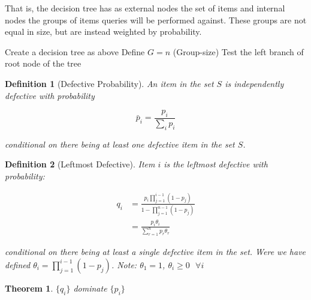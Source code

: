 \documentclass[11pt]{article}
\newtheorem{thm}{Theorem}[section]
\newtheorem{definition}{Definition}[section]
\begin{document}
That is, the decision tree has as external nodes the set of items and internal nodes the groups of items queries will be performed against. These groups are not equal in size, but are instead weighted by probability. 

\bigskip	
\begin{algorithm}[H]
 \SetLine %
 Create a decision tree as above\;
 Define \(G = n\) (Group-size)\;
 {Test the left branch of root node of the tree\;
  }
 \caption{Searching the Tree for a single defective}
\end{algorithm}
\bigskip	

\begin{definition}[Defective Probability]
An item in the set \(S\) is independently defective with probability

\begin{equation}
\bar{p}_i = \frac{p_i}{\sum_i p_i}
\end{equation}

conditional on there being at least one defective item in the set \(S\).
\end{definition}

\begin{definition}[Leftmost Defective]
Item \(i\) is the leftmost defective with probability:

\begin{align}
q_i &= \frac{p_i \prod_{j=1}^{i-1}\left(1-p_j\right)}{1 - \prod_{j=1}^{n-1}\left(1-p_j\right)} \\
&= \frac{p_i\theta_i}{\sum_{r=1}^n p_r\theta_r}
\end{align}

conditional on there being at least a single defective item in the set. Were we have defined \(\theta_i = \prod_{j=1}^{i-1}\left(1-p_j\right)\). Note: \(\theta_1 = 1\),  \( \theta_i \geq 0 \text{ } \forall i\)
\end{definition}

\begin{thm}
\(\{q_i\}\) dominate \(\{p_i\}\)
\end{thm}
\end{document}

